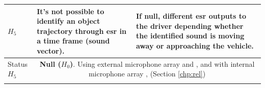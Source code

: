 \begin{table}[ht!]
\begin{tabular}{p{1.7cm}|p{6.5cm}|p{6.5cm}}
        $H_5$ & 
        It’s not possible to identify an object trajectory through \gls{esr} in a time frame (sound vector). & 
        If null, different \gls{esr} outputs to the driver depending whether the identified sound is moving away or approaching the vehicle.\\
        \hline
        \rowcolor{gray!20} Status $H_5$ & \multicolumn{2}{c}{\parbox{13.4cm}{\textbf{Null ($H_0$)}. Using external microphone array \cite{Marchegiani2022} and \cite{Sun2021}, and with internal microphone array \cite{Shabtai2019}, (Section \ref{chp:rel}) }} \\           
        \Xhline{2\arrayrulewidth}
    \end{tabular}
\end{table}

